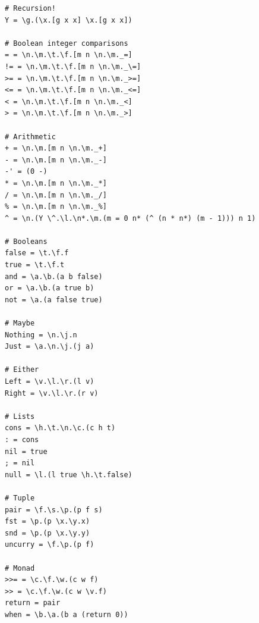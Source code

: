 \begin{verbatim}
# Recursion!
Y = \g.(\x.[g x x] \x.[g x x])

# Boolean integer comparisons
= = \n.\m.\t.\f.[m n \n.\m._=]
!= = \n.\m.\t.\f.[m n \n.\m._\=]
>= = \n.\m.\t.\f.[m n \n.\m._>=]
<= = \n.\m.\t.\f.[m n \n.\m._<=]
< = \n.\m.\t.\f.[m n \n.\m._<]
> = \n.\m.\t.\f.[m n \n.\m._>]

# Arithmetic
+ = \n.\m.[m n \n.\m._+]
- = \n.\m.[m n \n.\m._-]
-' = (0 -)
* = \n.\m.[m n \n.\m._*]
/ = \n.\m.[m n \n.\m._/]
% = \n.\m.[m n \n.\m._%]
^ = \n.(Y \^.\l.\n*.\m.(m = 0 n* (^ (n * n*) (m - 1))) n 1)

# Booleans
false = \t.\f.f
true = \t.\f.t
and = \a.\b.(a b false)
or = \a.\b.(a true b)
not = \a.(a false true)

# Maybe
Nothing = \n.\j.n
Just = \a.\n.\j.(j a)

# Either 
Left = \v.\l.\r.(l v)
Right = \v.\l.\r.(r v)

# Lists
cons = \h.\t.\n.\c.(c h t)
: = cons
nil = true
; = nil
null = \l.(l true \h.\t.false)

# Tuple
pair = \f.\s.\p.(p f s)
fst = \p.(p \x.\y.x)
snd = \p.(p \x.\y.y)
uncurry = \f.\p.(p f)

# Monad
>>= = \c.\f.\w.(c w f)
>> = \c.\f.\w.(c w \v.f)
return = pair
when = \b.\a.(b a (return 0))


\end{verbatim}
